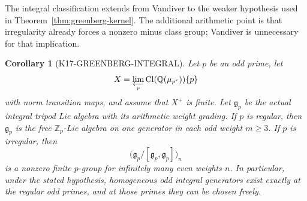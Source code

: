 \documentclass[11pt,a4paper]{article}
\newtheorem{corollary}[theorem]{Corollary}
\theoremstyle{definition}
\begin{document}
The integral classification extends from Vandiver to the weaker hypothesis
used in Theorem~\ref{thm:greenberg-kernel}.  The additional arithmetic
point is that irregularity already forces a nonzero minus class group;
Vandiver is unnecessary for that implication.

\begin{corollary}[K17-GREENBERG-INTEGRAL]
\label{cor:greenberg-integral}
Let $p$ be an odd prime, let
\[
 X=\varprojlim_r\operatorname{Cl}(\mathbb Q(\mu_{p^r}))\{p\}
\]
with norm transition maps, and assume that $X^+$ is finite.
Let $\mathfrak g_p$ be the actual integral tripod Lie algebra with
its arithmetic weight grading.
If $p$ is regular, then $\mathfrak g_p$ is the free
$\mathbb Z_p$-Lie algebra on one generator in each odd weight
$m\ge3$.  If $p$ is irregular, then
\[
 \bigl(\mathfrak g_p/[\mathfrak g_p,\mathfrak g_p]\bigr)_n
\]
is a nonzero finite $p$-group for infinitely many even weights $n$.
In particular, under the stated hypothesis, homogeneous odd integral
generators exist exactly at the regular odd primes, and at those primes
they can be chosen freely.
\end{corollary}
\end{document}
